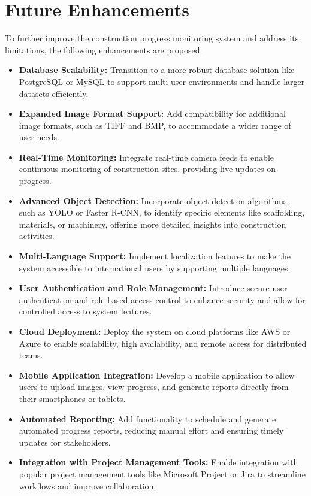 \documentclass[12pt,a4paper]{report}
\begin{document}
\section{Future Enhancements}
To further improve the construction progress monitoring system and address its limitations, the following enhancements are proposed:
\begin{itemize}
    \item \textbf{Database Scalability:} Transition to a more robust database solution like PostgreSQL or MySQL to support multi-user environments and handle larger datasets efficiently.
    \item \textbf{Expanded Image Format Support:} Add compatibility for additional image formats, such as TIFF and BMP, to accommodate a wider range of user needs.
    \item \textbf{Real-Time Monitoring:} Integrate real-time camera feeds to enable continuous monitoring of construction sites, providing live updates on progress.
    \item \textbf{Advanced Object Detection:} Incorporate object detection algorithms, such as YOLO or Faster R-CNN, to identify specific elements like scaffolding, materials, or machinery, offering more detailed insights into construction activities.
    \item \textbf{Multi-Language Support:} Implement localization features to make the system accessible to international users by supporting multiple languages.
    \item \textbf{User Authentication and Role Management:} Introduce secure user authentication and role-based access control to enhance security and allow for controlled access to system features.
    \item \textbf{Cloud Deployment:} Deploy the system on cloud platforms like AWS or Azure to enable scalability, high availability, and remote access for distributed teams.
    \item \textbf{Mobile Application Integration:} Develop a mobile application to allow users to upload images, view progress, and generate reports directly from their smartphones or tablets.
    \item \textbf{Automated Reporting:} Add functionality to schedule and generate automated progress reports, reducing manual effort and ensuring timely updates for stakeholders.
    \item \textbf{Integration with Project Management Tools:} Enable integration with popular project management tools like Microsoft Project or Jira to streamline workflows and improve collaboration.
\end{itemize}
\end{document}
